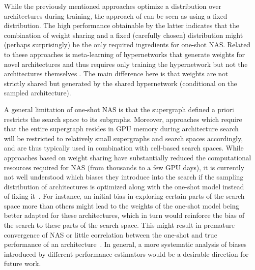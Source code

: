 \documentclass[twoside,11pt]{article}
\renewcommand{\cite}[1]{\citep{#1}}
\newcommand{\note}[1]{
	\noindent~\\
	\vspace{0.25cm}
	\fcolorbox{red}{yellow}{\parbox{0.97\textwidth}{#1\\}}
	\vspace{0.25cm}
}
\newcommand{\crc}[1]{#1}
\begin{document}
While the previously mentioned approaches optimize a distribution over architectures during training, the approach of \citet{ bender_icml:2018} can be seen as using a fixed distribution. The high performance obtainable by the latter indicates that the combination of weight sharing and a fixed (carefully chosen) distribution might (perhaps surprisingly) be the only required ingredients for one-shot NAS.
Related to these approaches is meta-learning of hypernetworks that generate weights for novel architectures and thus requires only training the hypernetwork but not the architectures themselves \cite{DBLP:journals/corr/abs-1708-05344,zhang2018graph}. The main difference here is that weights are not strictly shared but generated by the shared hypernetwork (conditional on the sampled architecture).   

A general limitation of one-shot NAS is that the supergraph defined a priori restricts the search space to its subgraphs. Moreover, approaches which require that the entire supergraph resides in GPU memory during architecture search will be restricted to relatively small supergraphs and search spaces accordingly, and are thus typically used in combination with cell-based search spaces. \crc{While approaches based on weight sharing have substantially reduced the computational resources required for NAS (from thousands to a few GPU days), it is currently not well understood which biases they introduce into the search if the sampling distribution of architectures is optimized along with the one-shot model instead of fixing it~\citep{bender_icml:2018}. For instance, an initial bias in exploring certain parts of the search space more than others might lead to the weights of the one-shot model being better adapted for these architectures, which in turn would reinforce the bias of the search to these parts of the search space. This might result in premature convergence of NAS or little correlation between the one-shot and true performance of an architecture~\citep{sciuto_evalnas}}. In general, a more systematic analysis of biases introduced by different performance estimators would be a desirable direction for future work.


\end{document}
